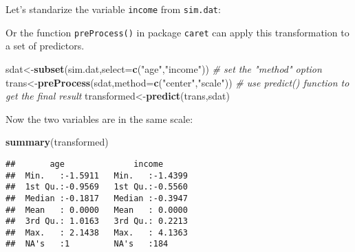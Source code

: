 \documentclass[
]{article}
\newenvironment{Shaded}{\begin{snugshade}}{\end{snugshade}}
\newcommand{\CommentTok}[1]{\textcolor[rgb]{0.56,0.35,0.01}{\textit{#1}}}
\newcommand{\DataTypeTok}[1]{\textcolor[rgb]{0.13,0.29,0.53}{#1}}
\newcommand{\KeywordTok}[1]{\textcolor[rgb]{0.13,0.29,0.53}{\textbf{#1}}}
\newcommand{\NormalTok}[1]{#1}
\newcommand{\OperatorTok}[1]{\textcolor[rgb]{0.81,0.36,0.00}{\textbf{#1}}}
\newcommand{\StringTok}[1]{\textcolor[rgb]{0.31,0.60,0.02}{#1}}
\begin{document}
Let's standarize the variable \texttt{income} from \texttt{sim.dat}:

\begin{Shaded}
\end{Shaded}

Or the function \texttt{preProcess()} in package \texttt{caret} can
apply this transformation to a set of predictors.

\begin{Shaded}
\begin{Highlighting}[]
\NormalTok{sdat<-}\KeywordTok{subset}\NormalTok{(sim.dat,}\DataTypeTok{select=}\KeywordTok{c}\NormalTok{(}\StringTok{"age"}\NormalTok{,}\StringTok{"income"}\NormalTok{))}
\CommentTok{# set the "method" option}
\NormalTok{trans<-}\KeywordTok{preProcess}\NormalTok{(sdat,}\DataTypeTok{method=}\KeywordTok{c}\NormalTok{(}\StringTok{"center"}\NormalTok{,}\StringTok{"scale"}\NormalTok{))}
\CommentTok{# use predict() function to get the final result}
\NormalTok{transformed<-}\KeywordTok{predict}\NormalTok{(trans,sdat)}
\end{Highlighting}
\end{Shaded}

Now the two variables are in the same scale:

\begin{Shaded}
\begin{Highlighting}[]
\KeywordTok{summary}\NormalTok{(transformed)}
\end{Highlighting}
\end{Shaded}

\begin{verbatim}
##       age              income       
##  Min.   :-1.5911   Min.   :-1.4399  
##  1st Qu.:-0.9569   1st Qu.:-0.5560  
##  Median :-0.1817   Median :-0.3947  
##  Mean   : 0.0000   Mean   : 0.0000  
##  3rd Qu.: 1.0163   3rd Qu.: 0.2213  
##  Max.   : 2.1438   Max.   : 4.1363  
##  NA's   :1         NA's   :184
\end{verbatim}
\end{document}
